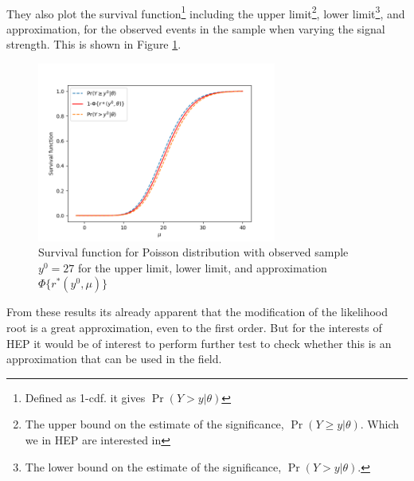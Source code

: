 \documentclass[14pt, a4paper]{article}  %
\begin{document}
\\They also plot the survival function\footnote{Defined as 1-cdf. it gives $\Pr(Y>y|\theta)$} including the upper limit\footnote{The upper bound on the estimate of the significance, $\Pr(Y\geq y|\theta)$. Which we in HEP are interested in}, lower limit\footnote{The lower bound on the estimate of the significance, $\Pr(Y> y|\theta)$.}, and approximation, for the observed events in the sample when varying the signal strength. This is shown in Figure \ref{fig:book_sf}.
\begin{figure}[!ht]
	\centering
        \includegraphics[width=0.7\textwidth]{book_example/Book_examplesbook_sig.png}
	\caption{Survival function for Poisson distribution with observed sample $y^0=27$ for the upper limit, lower limit, and approximation $\Phi\{r^*(y^0,\mu)\}$}\label{fig:book_sf}
\end{figure} 
\newpage\noindent From these results its already apparent that the modification of the likelihood root is a great approximation, even to the first order. But for the interests of HEP it would be of interest to perform further test to check whether this is an approximation that can be used in the field.
\end{document}
